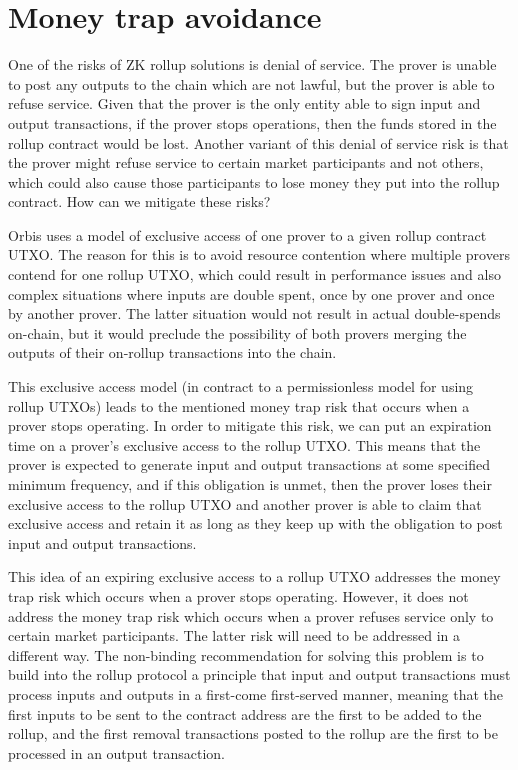 \documentclass[12pt]{article}
\begin{document}
\section{Money trap avoidance}

One of the risks of ZK rollup solutions is denial of service. The prover is unable to post any outputs to the chain which are not lawful, but the prover is able to refuse service. Given that the prover is the only entity able to sign input and output transactions, if the prover stops operations, then the funds stored in the rollup contract would be lost. Another variant of this denial of service risk is that the prover might refuse service to certain market participants and not others, which could also cause those participants to lose money they put into the rollup contract. How can we mitigate these risks?

Orbis uses a model of exclusive access of one prover to a given rollup contract UTXO. The reason for this is to avoid resource contention where multiple provers contend for one rollup UTXO, which could result in performance issues and also complex situations where inputs are double spent, once by one prover and once by another prover. The latter situation would not result in actual double-spends on-chain, but it would preclude the possibility of both provers merging the outputs of their on-rollup transactions into the chain.

This exclusive access model (in contract to a permissionless model for using rollup UTXOs) leads to the mentioned money trap risk that occurs when a prover stops operating. In order to mitigate this risk, we can put an expiration time on a prover's exclusive access to the rollup UTXO. This means that the prover is expected to generate input and output transactions at some specified minimum frequency, and if this obligation is unmet, then the prover loses their exclusive access to the rollup UTXO and another prover is able to claim that exclusive access and retain it as long as they keep up with the obligation to post input and output transactions.

This idea of an expiring exclusive access to a rollup UTXO addresses the money trap risk which occurs when a prover stops operating. However, it does not address the money trap risk which occurs when a prover refuses service only to certain market participants. The latter risk will need to be addressed in a different way. The non-binding recommendation for solving this problem is to build into the rollup protocol a principle that input and output transactions must process inputs and outputs in a first-come first-served manner, meaning that the first inputs to be sent to the contract address are the first to be added to the rollup, and the first removal transactions posted to the rollup are the first to be processed in an output transaction.
\end{document}
